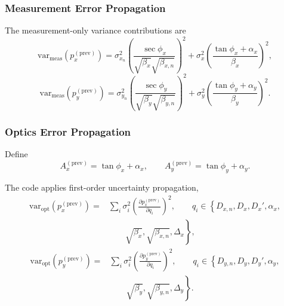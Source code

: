 \subsubsection{Measurement Error Propagation}

The measurement-only variance contributions are
\begin{equation}
\mathrm{var}_{\mathrm{meas}}\!\left(p_x^{(\mathrm{prev})}\right)
=
\sigma^2_{x_n}
\left(
\frac{\sec\phi_x}{\sqrt{\beta_x}\sqrt{\beta_{x,n}}}
\right)^2
+
\sigma^2_x
\left(
\frac{\tan\phi_x + \alpha_x}{\beta_x}
\right)^2,
\end{equation}
\begin{equation}
\mathrm{var}_{\mathrm{meas}}\!\left(p_y^{(\mathrm{prev})}\right)
=
\sigma^2_{y_n}
\left(
\frac{\sec\phi_y}{\sqrt{\beta_y}\sqrt{\beta_{y,n}}}
\right)^2
+
\sigma^2_y
\left(
\frac{\tan\phi_y + \alpha_y}{\beta_y}
\right)^2.
\end{equation}

\subsubsection{Optics Error Propagation}

Define
\begin{equation}
A_x^{(\mathrm{prev})} = \tan\phi_x + \alpha_x,
\qquad
A_y^{(\mathrm{prev})} = \tan\phi_y + \alpha_y.
\end{equation}

The code applies first-order uncertainty propagation,
\begin{equation}
\begin{split}
\mathrm{var}_{\mathrm{opt}}\!\left(p_x^{(\mathrm{prev})}\right)
=&
\sum_i \sigma_i^2
\left(
\frac{\partial p_x^{(\mathrm{prev})}}{\partial q_i}
\right)^2,
\qquad q_i \in \left\{
D_{x,n}, D_x, D_x', \alpha_x,\right.\\
&\qquad\left.\sqrt{\beta_x}, \sqrt{\beta_{x,n}}, \Delta_x
\right\},
\end{split}
\end{equation}
\begin{equation}
\begin{split}
\mathrm{var}_{\mathrm{opt}}\!\left(p_y^{(\mathrm{prev})}\right)
=&
\sum_i \sigma_i^2
\left(
\frac{\partial p_y^{(\mathrm{prev})}}{\partial q_i}
\right)^2,
\qquad q_i \in \left\{
D_{y,n}, D_y, D_y', \alpha_y,\right.\\
&\qquad\left.\sqrt{\beta_y}, \sqrt{\beta_{y,n}}, \Delta_y
\right\}.
\end{split}
\end{equation}

